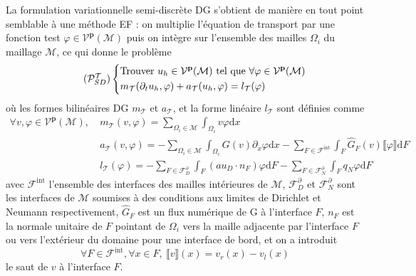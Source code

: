 \documentclass[11pt, a4paper, oneside]{report}
\begin{document}
\begin{appendices}
La formulation variationnelle semi-discrète DG s'obtient de manière en tout point semblable à une méthode EF : on multiplie l'équation de transport par une fonction test $\varphi \in \mathcal{V}^{\mathbf{p}}(\mathcal{M})$ puis on intègre sur l'ensemble des mailles $\Omega_i$ du maillage $\mathcal{M}$, ce qui donne le problème
\begin{equation} \tag{$\mathcal{P}_{SD}^\mathcal{T}$} \label{eq:Probleme_variationnel_transport}
    \left \{
    \begin{aligned}
        &\text{Trouver } u_h \in \mathcal{V}^{\mathbf{p}}(\mathcal{M}) \text{ tel que } \forall \varphi \in \mathcal{V}^{\mathbf{p}}(\mathcal{M}) \\
        &m_\mathcal{T}(\partial_t u_h, \varphi) + a_\mathcal{T}(u_h, \varphi) = l_\mathcal{T}(\varphi) 
    \end{aligned}
    \right .
\end{equation}
où les formes bilinéaires DG $m_\mathcal{T}$ et $a_\mathcal{T}$, et la forme linéaire $l_\mathcal{T}$ sont définies comme
\begin{equation}
    \begin{aligned}
        \forall v, \varphi \in \mathcal{V}^{\mathbf{p}}(\mathcal{M}), ~ & m_\mathcal{T}(v, \varphi) = \sum_{\Omega_i \in \mathcal{M}} \int_{\Omega_i} v \varphi \text{d}x \\
        & a_\mathcal{T}(v, \varphi) = - \sum_{\Omega_i \in \mathcal{M}} \int_{\Omega_i} G(v) \partial_x \varphi \text{d}x - \sum_{F \in \mathcal{F}^\text{int}} \int_F \widehat{G}_F(v) \llbracket \varphi \rrbracket \text{d}F \\
        & l_\mathcal{T}(\varphi) = - \sum_{F \in \mathcal{F}_D^\partial} \int_F (a u_D \cdot n_F) \varphi \text{d}F - \sum_{F \in \mathcal{F}_N^\partial} \int_F q_N \varphi \text{d}F
    \end{aligned}
\end{equation}
avec $\mathcal{F}^\text{int}$ l'ensemble des interfaces des mailles intérieures de $\mathcal{M}$, $\mathcal{F}_D^\partial$ et $\mathcal{F}_N^\partial$ sont les interfaces de $\mathcal{M}$ soumises à des conditions aux limites de Dirichlet et Neumann respectivement, $\widehat{G}_F$ est un flux numérique de G à l'interface $F$, $n_F$ est la normale unitaire de $F$ pointant de $\Omega_i$ vers la maille adjacente par l'interface $F$ ou vers l'extérieur du domaine pour une interface de bord, et on a introduit
\begin{equation}
    \forall F \in \mathcal{F}^\text{int}, \forall x \in F, ~ \llbracket v \rrbracket(x) = v_r(x) - v_l (x)
\end{equation}
le saut de $v$ à l'interface $F$. \\


\end{appendices}
\end{document}
